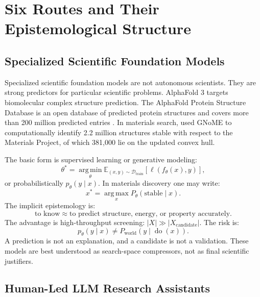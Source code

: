 \documentclass[11pt,a4paper]{article}
\newcommand{\E}{\mathbb{E}}
\newcommand{\doop}{\operatorname{do}}
\newcommand{\argmax}{\operatorname*{arg\,max}}
\newcommand{\argmin}{\operatorname*{arg\,min}}
\begin{document}
\section{Six Routes and Their Epistemological Structure}

\subsection{Specialized Scientific Foundation Models}

Specialized scientific foundation models are not autonomous scientists. They are strong predictors for particular scientific problems. AlphaFold 3 targets biomolecular complex structure prediction. The AlphaFold Protein Structure Database is an open database of predicted protein structures and covers more than 200 million predicted entries \citep{Varadi2024AlphaFoldDB,AlphaFoldDB2026}. In materials search, \citet{Merchant2023GNoME} used GNoME to computationally identify 2.2 million structures stable with respect to the Materials Project, of which 381,000 lie on the updated convex hull.

The basic form is supervised learning or generative modeling:
\begin{equation}
\theta^\ast=\argmin_{\theta}\E_{(x,y)\sim \mathcal{D}_{\mathrm{train}}}[\ell(f_{\theta}(x),y)],
\end{equation}
or probabilistically $p_{\theta}(y\mid x)$. In materials discovery one may write:
\begin{equation}
x^\ast=\argmax_x P_{\theta}(\mathrm{stable}\mid x).
\end{equation}
The implicit epistemology is:
\[
\boxed{\text{to know} \approx \text{to predict structure, energy, or property accurately}.}
\]
The advantage is high-throughput screening: $|X|\gg |X_{\mathrm{candidate}}|$. The risk is:
\begin{equation}
p_{\theta}(y\mid x)\neq P_{\mathrm{world}}(y\mid \doop(x)).
\end{equation}
A prediction is not an explanation, and a candidate is not a validation. These models are best understood as search-space compressors, not as final scientific justifiers.

\subsection{Human-Led LLM Research Assistants}
\end{document}
